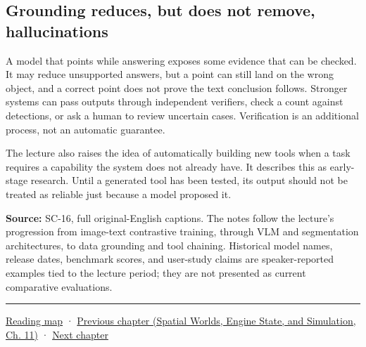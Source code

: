 \subsection{Grounding reduces, but does not remove, hallucinations}\label{04-visual-computing-ii-ch031-grounding-reduces-but-does-not-remove-hallucinations}

A model that points while answering exposes some evidence that can be checked. It may reduce unsupported answers, but a point can still land on the wrong object, and a correct point does not prove the text conclusion follows. Stronger systems can pass outputs through independent verifiers, check a count against detections, or ask a human to review uncertain cases. Verification is an additional process, not an automatic guarantee.

The lecture also raises the idea of automatically building new tools when a task requires a capability the system does not already have. It describes this as early-stage research. Until a generated tool has been tested, its output should not be treated as reliable just because a model proposed it.

\textbf{Source:} SC-16, full original-English captions. The notes follow the lecture's progression from image-text contrastive training, through VLM and segmentation architectures, to data grounding and tool chaining. Historical model names, release dates, benchmark scores, and user-study claims are speaker-reported examples tied to the lecture period; they are not presented as current comparative evaluations.

\begin{center}\rule{0.5\linewidth}{0.5pt}\end{center}

\hyperref[volume-reading-map]{Reading map} · \href{../05-Spatial-Worlds-Engine-State-and-Simulation/main.pdf\#nameddest=04-visual-computing-ii-ch030-mesh-operators-boundaries-and-diffusion}{Previous chapter (Spatial Worlds, Engine State, and Simulation, Ch. 11)} · \hyperref[04-visual-computing-ii-ch032-pose-estimation-and-robust-fitting]{Next chapter}
